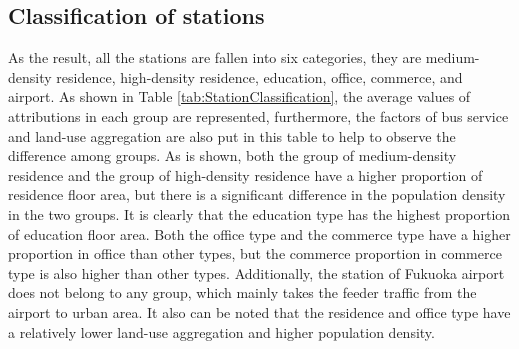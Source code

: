 \documentclass[utf8]{article}
\begin{document}
\subsection{Classification of stations}
\indent

%
As the result, all the stations are fallen into six categories, they are medium-density residence, high-density residence, education, office, commerce, and airport. As shown in Table \ref{tab:StationClassification}, the average values of attributions in each group are represented, furthermore, the factors of bus service and land-use aggregation are also put in this table to help to observe the difference among groups. As is shown, both the group of medium-density residence and the group of high-density residence have a higher proportion of residence floor area, but there is a significant difference in the population density in the two groups. It is clearly that the education type has the highest proportion of education floor area. Both the office type and the commerce type have a higher proportion in office than other types, but the commerce proportion in commerce type is also higher than other types. Additionally, the station of Fukuoka airport does not belong to any group, which mainly takes the feeder traffic from the airport to urban area. It also can be noted that the residence and office type have a relatively lower land-use aggregation and higher population density.
\end{document}
